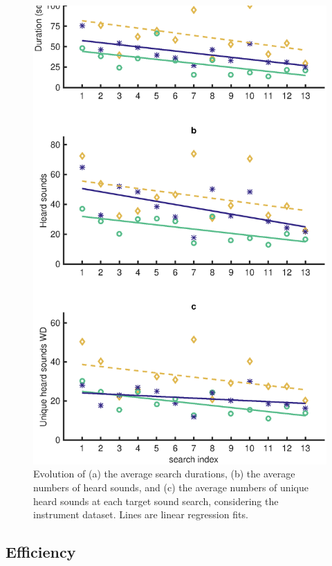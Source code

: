 \documentclass{aes2e}
\begin{document}
\begin{figure}[t]
\begin{center}
\includegraphics[width=\columnwidth]{gfx/analyse_music2.eps} 
\end{center}
\caption{\label{fig2Music} Evolution of (a) the average search durations, (b) the average numbers of heard sounds, and (c) the average numbers of unique heard sounds at each target sound search, considering the instrument dataset. Lines are linear regression fits.}
\end{figure}

\subsection{Efficiency}
\end{document}
